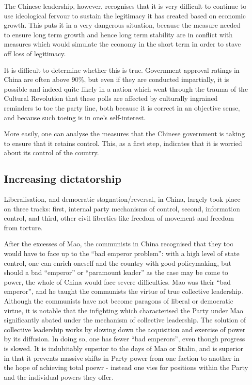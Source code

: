 \documentclass[1opt,a4paper]{article}
\newcounter{count}
\begin{document}
\begin{multicols}{2}
The Chinese leadership, however, recognises that it is very difficult to continue to use ideological fervour to sustain the legitimacy it has created based on economic growth. This puts it in a very dangerous situation, because the measure needed to ensure long term growth and hence long term stability are in conflict with measures which would simulate the economy in the short term in order to stave off loss of legitimacy.

It is difficult to determine whether this is true. Government approval ratings in China are often above 90\%, but even if they are conducted impartially, it is possible and indeed quite likely in a nation which went through the trauma of the Cultural Revolution that these polls are affected by culturally ingrained reminders to toe the party line, both because it is correct in an objective sense, and because such toeing is in one's self-interest.

More easily, one can analyse the measures that the Chinese government is taking to ensure that it retains control. This, as a first step, indicates that it is worried about its control of the country.

\subsection{Increasing dictatorship}

Liberalisation, and democratic stagnation/reversal, in China, largely took place on three tracks: first, internal party mechanisms of control, second, information control, and third, other civil liberties like freedom of movement and freedom from torture.

After the excesses of Mao, the communists in China recognised that they too would have to face up to the ``bad emperor problem'': with a high level of state control, one can enrich oneself and the country with good policymaking, but should a bad ``emperor'' or ``paramount leader'' as the case may be come to power, the whole of China would face severe difficulties. Mao was their ``bad emperor'', and he taught the communists the virtue of true collective leadership. Although the communists have not become paragons of liberal or democratic virtue, it is notable that the infighting which characterised the Party under Mao significantly abated under the mechanism of collective leadership. The solution of collective leadership works by slowing down the acquisition and exercise of power by its diffusion. In doing so, one has fewer ``bad emperors'', even though progress is slowed. It is indubitably superior to the days of Mao or Stalin, and is superior in that it prevents massive shifts in Party power from one faction to another in the hope of achieving total poewr - instead one vies for positions within the Party and the individual powers they offer.


\end{multicols}
\end{document}
